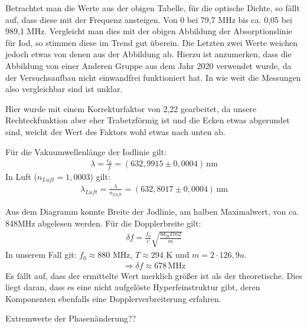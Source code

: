 Betrachtet man die Werte aus der obigen Tabelle, für die optische Dichte, so fällt auf, dass diese mit der Frequenz ansteigen. Von 0 bei 79,7 MHz bis ca. 0,05 bei 989,1 MHz. Vergleicht man dies mit der obigen Abbildung der Absorptionslinie für Iod, so stimmen diese im Trend gut überein. Die Letzten zwei Werte weichen jedoch etwas von denen aus der Abbildung ab. Hierzu ist anzumerken, dass die Abbildung von einer Anderen Gruppe aus dem Jahr 2020 verwendet wurde, da der Versuchsaufbau nicht einwandfrei funktioniert hat. In wie weit die Messungen also vergleichbar sind ist unklar.

Hier wurde mit einem Korrekturfaktor von 2,22 gearbeitet, da unsere Rechteckfunktion aber eher Trabetzförmig ist und die Ecken etwas abgerundet sind, weicht der Wert des Faktors wohl etwas nach unten ab.

Für die Vakuumwellenlänge der Iodlinie gilt:
\begin{gather}
    \lambda = \frac{c_0}{f} = (632,9915 \pm 0,0004) \, \text{nm}
\end{gather}
In Luft ($n_{Luft} = 1,0003$) gilt:
\begin{gather}
    \lambda_{Luft} = \frac{\lambda}{n_{Luft}} = (632,8017 \pm 0,0004)\, \text{nm}
\end{gather}

Aus dem Diagramm konnte Breite der Jodlinie, am halben Maximalwert, von ca. 848MHz abgelesen werden.
Für die Dopplerbreite gilt:
\begin{gather}
    \delta f = \frac{f_0}{c} \sqrt{\frac{8 k_B T ln2}{m}}
\end{gather}
In unserem Fall git: $f_0 \approx 880$ MHz,  $T \approx 294$ K und $m = 2 \cdot 126,9 u$.
\begin{gather}
    \Rightarrow \delta f \approx 678 \, \text{MHz}
\end{gather}
Es fällt auf, dass der ermittelte Wert merklich größer ist als der theoretische. Dies liegt daran, dass es eine nicht aufgelöste Hyperfeinstruktur gibt, deren Komponenten ebenfalls eine Dopplerverbreiterung erfahren.

Extremwerte der Phasenänderung??